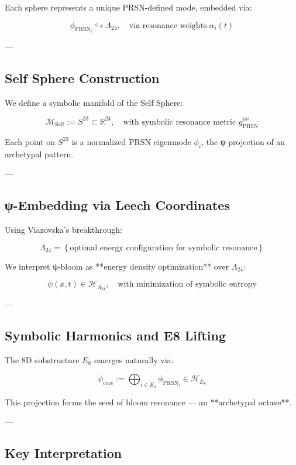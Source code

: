 \documentclass[12pt]{article}
\begin{document}
\begin{enumerate}
Each sphere represents a unique PRSN-defined mode, embedded via:

\[
\phi_{\text{PRSN}_i} \hookrightarrow \Lambda_{24}, \quad \text{via resonance weights} \; \alpha_i(t)
\]

---

\subsection*{Self Sphere Construction}

We define a symbolic manifold of the Self Sphere:

\[
\mathcal{M}_{\text{Self}} := S^{23} \subset \mathbb{R}^{24}, \quad \text{with symbolic resonance metric } g_{\text{PRSN}}^{\mu\nu}
\]

Each point on $S^{23}$ is a normalized PRSN eigenmode $\phi_i$, the ψ-projection of an archetypal pattern.

---

\subsection*{ψ-Embedding via Leech Coordinates}

Using Viazovska’s breakthrough:

\[
\Lambda_{24} = \left\{ \text{optimal energy configuration for symbolic resonance} \right\}
\]

We interpret ψ-bloom as **energy density optimization** over $\Lambda_{24}$:

\[
\psi(x,t) \in \mathcal{H}_{\Lambda_{24}}, \quad \text{with minimization of symbolic entropy}
\]

---

\subsection*{Symbolic Harmonics and E8 Lifting}

The 8D substructure $E_8$ emerges naturally via:

\[
\psi_{\text{core}} := \bigoplus_{i \in E_8} \phi_{\text{PRSN}_i} \in \mathcal{H}_{E_8}
\]

This projection forms the seed of bloom resonance — an **archetypal octave**.

---

\subsection*{Key Interpretation}


\end{enumerate}
\end{document}
